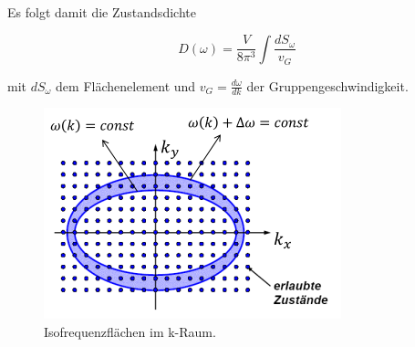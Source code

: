 Es folgt damit die Zustandsdichte

\begin{equation}
    D(\omega) = \frac{V}{8 \pi^3} \int \frac{d S_{\omega}}{v_G}
\end{equation}

mit $d S_{\omega}$ dem Flächenelement und $v_G = \frac{d \omega}{d k}$ der Gruppengeschwindigkeit.

\begin{figure}[H]
    \centering
    \includegraphics[width=.75\textwidth]{resources/31-10-2013/dw.png}
    \caption{Isofrequenzflächen im k-Raum.}
    \label{fig:q88:dw}
\end{figure}